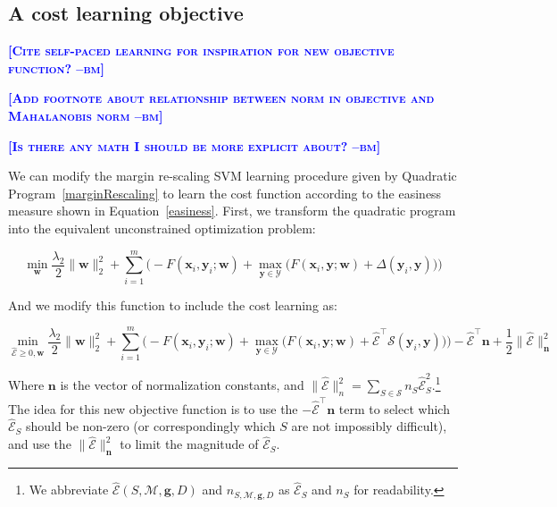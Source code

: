 \documentclass{article} %
\newcommand{\bmcomment}[1]{\textcolor{blue}{\textsc{\textbf{[#1 --bm]}}}}
\begin{document}
\subsection{A cost learning objective}

\bmcomment{Cite self-paced learning for inspiration for new objective function?}

\bmcomment{Add footnote about relationship between norm in objective and
Mahalanobis norm}

\bmcomment{Is there any math I should be more explicit about?}

We can modify the margin re-scaling SVM learning procedure given by 
Quadratic Program~\ref{marginRescaling} to learn the cost function 
according to the easiness measure shown in Equation~\ref{easiness}.
First, we transform the quadratic program
into the equivalent unconstrained optimization problem:

\begin{equation}
\label{svmObjective}
\min_{\mathbf{w}} \frac{\lambda_2}{2}\|\mathbf{w}\|_2^2 + \sum_{i=1}^m\bigg(-F(\mathbf{x}_i,\mathbf{y}_i;\mathbf{w})+\max_{\mathbf{y}\in \mathcal{Y}}\Big(F(\mathbf{x}_i,\mathbf{y};\mathbf{w})+\Delta(\mathbf{y}_i,\mathbf{y})\Big)\bigg)
\end{equation}

And we modify this function to include the cost learning as:

\begin{equation}
\label{costObjective}
\min_{\mathbf{\mathcal{\hat{E}}}\geq 0,\mathbf{w}} \frac{\lambda_2}{2}\|\mathbf{w}\|_2^2 + \sum_{i=1}^m\bigg(-F(\mathbf{x}_i,\mathbf{y}_i;\mathbf{w})+\max_{\mathbf{y}\in \mathcal{Y}}\Big(F(\mathbf{x}_i,\mathbf{y};\mathbf{w})+\mathbf{\mathcal{\hat{E}}}^\top \mathbf{\mathcal{S}}(\mathbf{y}_i,\mathbf{y})\Big)\bigg)-\mathbf{\mathcal{\hat{E}}}^\top\mathbf{n}+\frac{1}{2}\|\mathbf{\mathcal{\hat{E}}}\|^2_\mathbf{n}
\end{equation}

Where $\mathbf{n}$ is the vector of normalization constants, and 
$\|\mathbf{\mathcal{\hat{E}}}\|^2_n=\sum_{S\in\mathcal{S}}n_S\mathcal{\hat{E}}_S^2$.\footnote{
  We abbreviate $\mathcal{\hat{E}}(S,\mathcal{M},\mathbf{g},D)$ and 
 $n_{S,\mathcal{M},\mathbf{g},D}$ as $\mathcal{\hat{E}}_S$ and $n_S$ for 
 readability.
}
The idea for this new objective function is to use the 
$-\mathbf{\mathcal{\hat{E}}}^\top\mathbf{n}$ term to select which 
$\mathcal{\hat{E}}_S$
should be non-zero (or correspondingly which $S$ are not 
impossibly difficult), and use the $\|\mathcal{\hat{E}}\|^2_\mathbf{n}$ 
to limit the magnitude of $\mathcal{\hat{E}}_S$.
\end{document}
